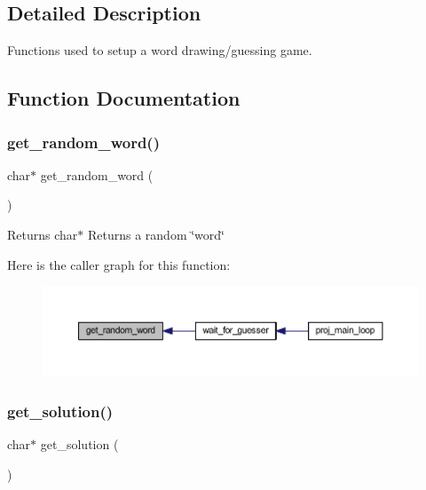 \subsection{Detailed Description}
Functions used to setup a word drawing/guessing game. 

\subsection{Function Documentation}
\mbox{\label{group__wordpicker_gae82a8e0c2ea083c8aeb39f8dcd1357a6}} 
\subsubsection{\texorpdfstring{get\+\_\+random\+\_\+word()}{get\_random\_word()}}
{\footnotesize\ttfamily char$\ast$ get\+\_\+random\+\_\+word (\begin{DoxyParamCaption}{ }\end{DoxyParamCaption})}

\begin{DoxyReturn}{Returns}
char$\ast$ Returns a random \char`\"{}word\char`\"{} 
\end{DoxyReturn}
Here is the caller graph for this function\+:\nopagebreak
\begin{figure}[H]
\begin{center}
\leavevmode
\includegraphics[width=350pt]{group__wordpicker_gae82a8e0c2ea083c8aeb39f8dcd1357a6_icgraph}
\end{center}
\end{figure}
\mbox{\label{group__wordpicker_gac8454d96157b95fc004c5188c7879cb7}} 
\subsubsection{\texorpdfstring{get\+\_\+solution()}{get\_solution()}}
{\footnotesize\ttfamily char$\ast$ get\+\_\+solution (\begin{DoxyParamCaption}{ }\end{DoxyParamCaption})}

